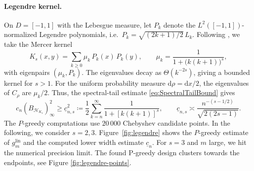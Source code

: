 \documentclass[11pt,reqno, a4paper]{article}
\numberwithin{equation}{section}
\newcommand{\lin}{\ensuremath{\mathrm{lin}}}
\begin{document}
\paragraph{Legendre kernel.}
On $D=[-1,1]$ with the Lebesgue measure, let $P_k$ denote the $L^2([-1,1])$-normalized Legendre polynomials, i.e.\ $P_k=\sqrt{(2k+1)/2}\,L_k$.
Following \cite[\S7.3]{PU}, we take the Mercer kernel
\begin{equation}\label{eq:legendre}
  K_s(x,y)=\sum_{k\ge0}\mu_k\,P_k(x)\,P_k(y),
  \qquad
  \mu_k=\frac{1}{1+\bigl(k(k+1)\bigr)^{s}},
\end{equation}
with eigenpairs $(\mu_k,P_k)$.
The eigenvalues decay as $\Theta(k^{-2s})$, giving a bounded kernel for $s>1$.
For the uniform probability measure $\mathrm d\rho=\mathrm dx/2$, the eigenvalues of $C_\rho$ are $\mu_k/2$.
Thus, the spectral-tail estimate \eqref{eq:SpectralTailBound} gives
\begin{equation}\label{eq:legendre-tail-lower}
 c_n(B_{\mathcal H_{K_s}})_\infty^2
 \geq \underline c_{n,s}^2
 \coloneqq
 \frac12\sum_{k=n}^{\infty}
 \frac{1}{1+[k(k+1)]^s},
 \qquad
 \underline c_{n,s}\asymp
 \frac{n^{-(s-1/2)}}{\sqrt{2(2s-1)}}.
\end{equation}
The \(P\)-greedy computations use \(20\,000\) Chebyshev candidate points.
In the following, we consider $s=2,3$.
Figure~\ref{fig:legendre} shows the $P$-greedy estimate of $g_m^{\lin}$ and the computed lower width estimate $\underline c_n$.
For $s=3$ and $m$ large, we hit the numerical precision limit.
The found P-greedy design clusters towards the endpoints, see Figure \ref{fig:legendre-points}.
\end{document}
